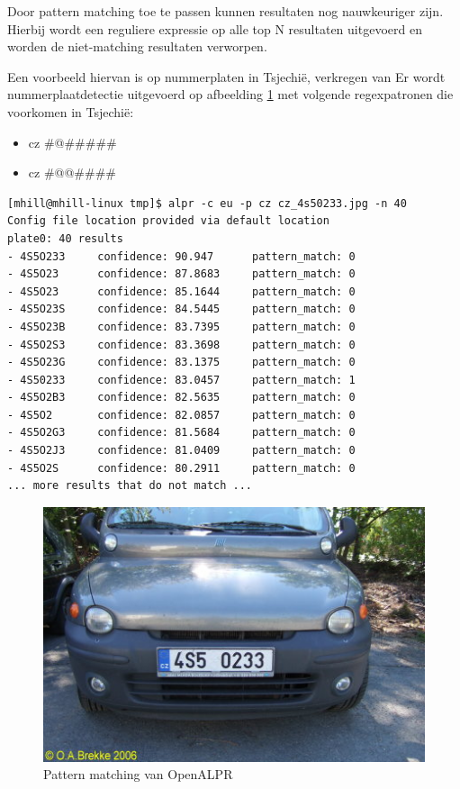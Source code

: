 Door pattern matching toe te passen kunnen resultaten nog nauwkeuriger zijn. Hierbij wordt een reguliere expressie op alle top N resultaten uitgevoerd en worden de niet-matching resultaten verworpen.

Een voorbeeld hiervan is op nummerplaten in Tsjechië, verkregen van \textcite{openalpr2015pattern}
Er wordt nummerplaatdetectie uitgevoerd op afbeelding \ref{patternmatching} met volgende regexpatronen die voorkomen in Tsjechië:
\begin{itemize}
	\item cz \#@\#\#\#\#\#
	\item cz \#@@\#\#\#\#
\end{itemize}

\begin{lstlisting}
[mhill@mhill-linux tmp]$ alpr -c eu -p cz cz_4s50233.jpg -n 40
Config file location provided via default location
plate0: 40 results
- 4S5O233     confidence: 90.947      pattern_match: 0
- 4S5O23      confidence: 87.8683     pattern_match: 0
- 4S5O23      confidence: 85.1644     pattern_match: 0
- 4S5O23S     confidence: 84.5445     pattern_match: 0
- 4S5O23B     confidence: 83.7395     pattern_match: 0
- 4S5O2S3     confidence: 83.3698     pattern_match: 0
- 4S5O23G     confidence: 83.1375     pattern_match: 0
- 4S50233     confidence: 83.0457     pattern_match: 1
- 4S5O2B3     confidence: 82.5635     pattern_match: 0
- 4S5O2       confidence: 82.0857     pattern_match: 0
- 4S5O2G3     confidence: 81.5684     pattern_match: 0
- 4S5O2J3     confidence: 81.0409     pattern_match: 0
- 4S5O2S      confidence: 80.2911     pattern_match: 0
... more results that do not match ...
\end{lstlisting}

\begin{figure}[h!]
	\centering
	\includegraphics[width=\linewidth]{img/pattern-matching.jpg}
	\caption{Pattern matching van OpenALPR \autocite{openalpr2015pattern}}
	\label{patternmatching}
\end{figure}


